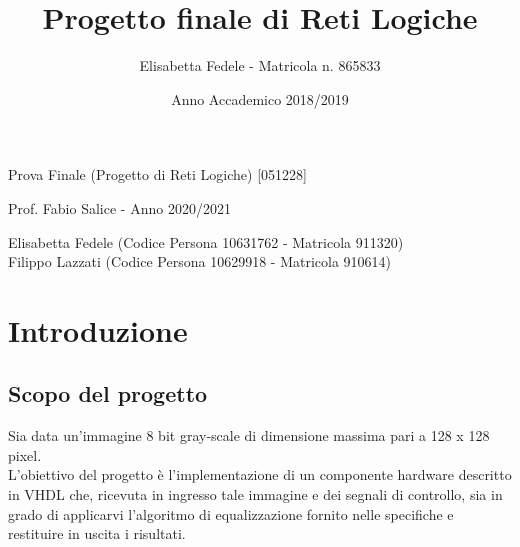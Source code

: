\documentclass{article}
\title{Progetto finale di Reti Logiche}
\author{Elisabetta Fedele - Matricola n. 865833}
\date{Anno Accademico 2018/2019}
\begin{document}
\thispagestyle{empty} 
\begin{titlepage}
    \begin{center}
       \vspace*{2cm}
       {\LARGE Prova Finale (Progetto di Reti Logiche) [051228]} %
       \vspace{1cm}
    \begin{large}   
    
        
        { Prof. Fabio Salice - Anno 2020/2021}
       \vspace{8cm}
        
        {Elisabetta Fedele (Codice Persona 10631762 - Matricola 911320)\\Filippo Lazzati (Codice Persona 10629918 - Matricola 910614)}
       \vspace{3cm}
       
    \end{large}  
   \end{center}
\end{titlepage}
\tableofcontents


\pagebreak
\section{Introduzione} \label{subsection-introduz}

\subsection{Scopo del progetto}
Sia data un’immagine 8 bit gray-scale di dimensione massima pari a 128 x 128 pixel. 
\\L’obiettivo del progetto è l’implementazione di un componente hardware descritto in VHDL che, ricevuta in ingresso tale immagine e dei segnali di controllo, sia in grado di applicarvi l’algoritmo di equalizzazione fornito nelle specifiche e restituire in uscita i risultati.
\end{document}

